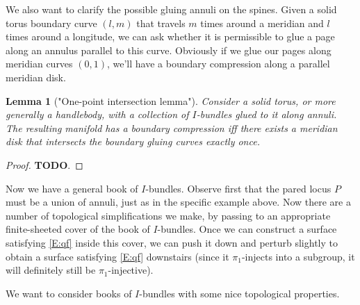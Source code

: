 \documentclass[12pt]{amsart}
\newtheorem{lemma}[theorem]{Lemma}
\theoremstyle{definition}
\theoremstyle{remark}
\begin{document}
We also want to clarify the possible gluing annuli on the spines. Given a solid
torus boundary curve $(l,m)$ that travels $m$ times around a meridian and $l$
times around a longitude, we can ask whether it is permissible to glue a page
along an annulus parallel to this curve. Obviously if we glue our pages along
meridian curves $(0,1)$, we'll have a boundary compression along a parallel
meridian disk.


\begin{lemma}["One-point intersection lemma"]

Consider a solid torus, or more generally a handlebody, with a collection of
$I$-bundles glued to it along annuli. The resulting manifold has a boundary
compression iff there exists a meridian disk that intersects the boundary
gluing curves exactly once.

\end{lemma}

\begin{proof}

{\bf TODO}.

\end{proof}

Now we have a general book of $I$-bundles. Observe first that the pared locus
$P$ must be a union of annuli, just as in the specific example above.  Now
there are a number of topological simplifications we make, by passing to an
appropriate finite-sheeted cover of the book of $I$-bundles.  Once we can
construct a surface satisfying \eqref{E:qf} inside this cover, we can push it
down and perturb slightly to obtain a surface satisfying \eqref{E:qf}
downstairs (since it $\pi_1$-injects into a subgroup, it will definitely still
be $\pi_1$-injective).

We want to consider books of $I$-bundles with some nice topological properties.
\end{document}
